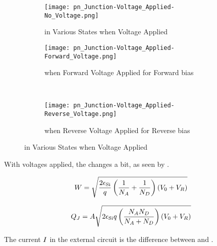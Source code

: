 \begin{figure}[h!tbp]
  \centering
  \begin{subfigure}{0.48\linewidth}
    \centering
    \texttt{[image: pn\_Junction-Voltage\_Applied-No\_Voltage.png]}
    \caption{\PNJunction{} in Various States when Voltage Applied}
    \label{fig:pn_Junction-Voltage_Applied-No_Voltage}
  \end{subfigure}
  \begin{subfigure}{0.48\linewidth}
    \centering
    \texttt{[image: pn\_Junction-Voltage\_Applied-Forward\_Voltage.png]}
    \caption{\PNJunction{} when Forward Voltage Applied for Forward bias}
    \label{fig:pn_Junction-Voltage_Applied-Forward_Voltage}
  \end{subfigure}
  \\
  \begin{subfigure}{0.48\linewidth}
    \centering
    \texttt{[image: pn\_Junction-Voltage\_Applied-Reverse\_Voltage.png]}
    \caption{\PNJunction{} when Reverse Voltage Applied for Reverse bias}
    \label{fig:pn_Junction-Voltage_Applied-Reverse_Voltage}
  \end{subfigure}
  \caption{\PNJunction{} in Various States when Voltage Applied \parencite[p.~156]{sedraTextbook7}}
  \label{fig:pn_Junction-Voltage_Applied}
\end{figure}

With voltages applied, the  changes a bit, as seen by .

\begin{equation}\label{eq:Depletion_Layer_Width-Voltage_Applied}
  W = \sqrt{\frac{2 \epsilon_{\mathrm{Si}}}{q} \left( \frac{1}{N_{A}} + \frac{1}{N_{D}} \right) (V_{0} + V_{R})}
\end{equation}

\begin{equation}\label{eq:Depletion_Layer_Charge-Voltage_Applied}
  Q_{J} = A \sqrt{2 \epsilon_{\mathrm{Si}} q \left( \frac{N_{A} N_{D}}{N_{A} + N_{D}} \right) (V_{0} + V_{R})}
\end{equation}

The current $I_{}$ in the external circuit is the difference between \DriftCurrent{} and \DiffusionCurrent{}.

